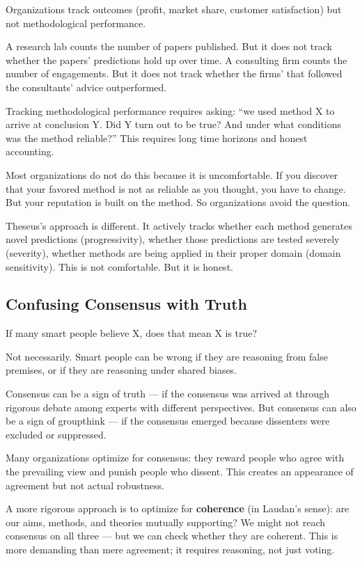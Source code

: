 \documentclass[11pt,letterpaper]{article}
\begin{document}
Organizations track outcomes (profit, market share, customer satisfaction) but not methodological performance.

A research lab counts the number of papers published. But it does not track whether the papers' predictions hold up over time. A consulting firm counts the number of engagements. But it does not track whether the firms' that followed the consultants' advice outperformed.

Tracking methodological performance requires asking: ``we used method X to arrive at conclusion Y. Did Y turn out to be true? And under what conditions was the method reliable?'' This requires long time horizons and honest accounting.

Most organizations do not do this because it is uncomfortable. If you discover that your favored method is not as reliable as you thought, you have to change. But your reputation is built on the method. So organizations avoid the question.

Theseus's approach is different. It actively tracks whether each method generates novel predictions (progressivity), whether those predictions are tested severely (severity), whether methods are being applied in their proper domain (domain sensitivity). This is not comfortable. But it is honest.

\subsection*{Confusing Consensus with Truth}

If many smart people believe X, does that mean X is true?

Not necessarily. Smart people can be wrong if they are reasoning from false premises, or if they are reasoning under shared biases.

Consensus can be a sign of truth — if the consensus was arrived at through rigorous debate among experts with different perspectives. But consensus can also be a sign of groupthink — if the consensus emerged because dissenters were excluded or suppressed.

Many organizations optimize for consensus: they reward people who agree with the prevailing view and punish people who dissent. This creates an appearance of agreement but not actual robustness.

A more rigorous approach is to optimize for \textbf{coherence} (in Laudan's sense): are our aims, methods, and theories mutually supporting? We might not reach consensus on all three — but we can check whether they are coherent. This is more demanding than mere agreement; it requires reasoning, not just voting.
\end{document}
